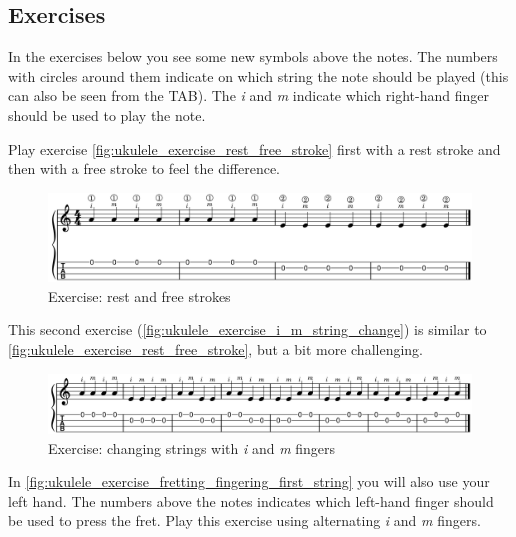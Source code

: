 \newpage

\subsection{Exercises}

In the exercises below you see some new symbols above the notes. The numbers with circles around them indicate on which string the note should be played (this can also be seen from the TAB). The \textit{i} and \textit{m} indicate which right-hand finger should be used to play the note.

Play exercise \autoref{fig:ukulele_exercise_rest_free_stroke} first with a rest stroke and then with a free stroke to feel the difference.

\begin{figure}[h]
    \centering
    \includegraphics[width=\textwidth]{../../MuseScore/Ukulele/UkuleleExerciseFreeAndRestStokeSimple.png}
    \caption{Exercise: rest and free strokes}
    \label{fig:ukulele_exercise_rest_free_stroke}
\end{figure}

This second exercise (\autoref{fig:ukulele_exercise_i_m_string_change}) is similar to \autoref{fig:ukulele_exercise_rest_free_stroke}, but a bit more challenging.

\begin{figure}[h]
    \centering
    \includegraphics[width=\textwidth]{../../MuseScore/Ukulele/UkuleleExerciseFreeAndRestStokeStepTwo.png}
    \caption{Exercise: changing strings with \textit{i} and \textit{m} fingers}
    \label{fig:ukulele_exercise_i_m_string_change}
\end{figure}

\newpage

In \autoref{fig:ukulele_exercise_fretting_fingering_first_string} you will also use your left hand. The numbers above the notes indicates which left-hand finger should be used to press the fret. Play this exercise using alternating \textit{i} and \textit{m} fingers. 

